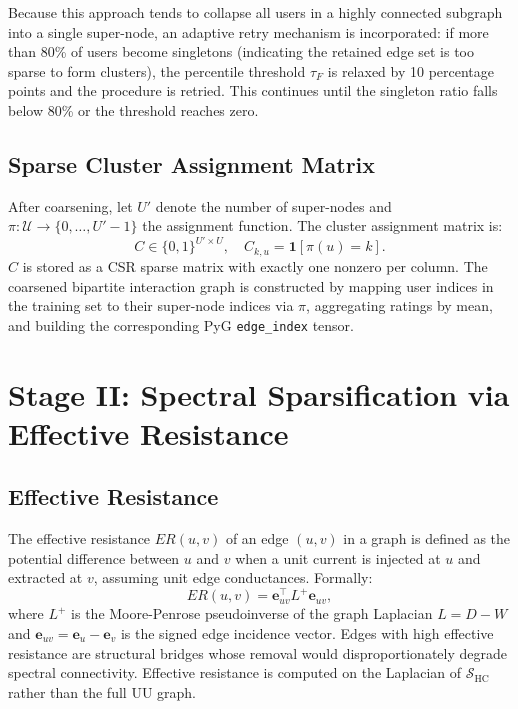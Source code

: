Because this approach tends to collapse all users in a highly connected subgraph into a single super-node, an adaptive retry mechanism is incorporated: if more than 80\% of users become singletons (indicating the retained edge set is too sparse to form clusters), the percentile threshold $\tau_F$ is relaxed by 10 percentage points and the procedure is retried. This continues until the singleton ratio falls below 80\% or the threshold reaches zero.

\subsection{Sparse Cluster Assignment Matrix}

After coarsening, let $U'$ denote the number of super-nodes and $\pi: \mathcal{U} \to \{0,\ldots,U'-1\}$ the assignment function. The cluster assignment matrix is:
\begin{equation}
    C \in \{0,1\}^{U' \times U}, \quad C_{k,u} = \mathbf{1}[\pi(u) = k].
    \label{eq:C}
\end{equation}
$C$ is stored as a CSR sparse matrix with exactly one nonzero per column. The coarsened bipartite interaction graph is constructed by mapping user indices in the training set to their super-node indices via $\pi$, aggregating ratings by mean, and building the corresponding PyG \texttt{edge\_index} tensor.

\section{Stage II: Spectral Sparsification via Effective Resistance}
\label{sec:stage2}

\subsection{Effective Resistance}

The effective resistance $ER(u,v)$ of an edge $(u,v)$ in a graph is defined as the potential difference between $u$ and $v$ when a unit current is injected at $u$ and extracted at $v$, assuming unit edge conductances. Formally:
\begin{equation}
    ER(u,v) = \boldsymbol{e}_{uv}^\top L^+ \boldsymbol{e}_{uv},
    \label{eq:er_def}
\end{equation}
where $L^+$ is the Moore-Penrose pseudoinverse of the graph Laplacian $L = D - W$ and $\boldsymbol{e}_{uv} = \boldsymbol{e}_u - \boldsymbol{e}_v$ is the signed edge incidence vector. Edges with high effective resistance are structural bridges whose removal would disproportionately degrade spectral connectivity. Effective resistance is computed on the Laplacian of $\mathcal{S}_\text{HC}$ rather than the full UU graph.

